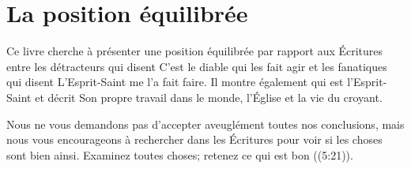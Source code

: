 \section{La position équilibrée}

Ce livre cherche à présenter une position équilibrée par rapport aux Écritures
 entre les détracteurs qui disent\frcolon{} \Og C'est le diable qui les fait agir \Fg{}
 et les fanatiques qui disent\frcolon{} \Og L'Esprit-Saint me l'a fait faire. \Fg{}
 Il montre également qui est l'Esprit-Saint et décrit Son propre travail dans
 le monde, l'Église et la vie du croyant.

Nous ne vous demandons pas d'accepter aveuglément toutes nos conclusions, mais nous
 vous encourageons à rechercher dans les Écritures pour voir si les choses sont
 bien ainsi. \Og Examinez toutes choses; retenez ce qui est bon \Fg{}
 ((5:21)).
\thispagestyle{chapterend}

